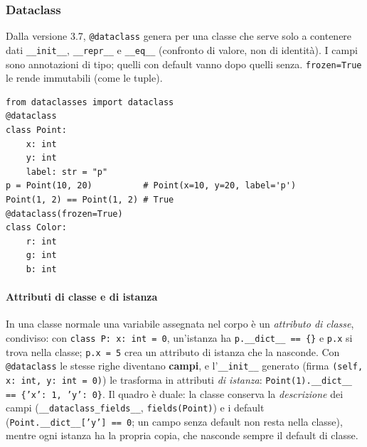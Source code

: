 \documentclass[a4paper,12pt]{article}
\begin{document}
\subsubsection{Dataclass}
Dalla versione 3.7, \texttt{@dataclass} genera per una classe che serve solo a contenere dati
\texttt{\_\_init\_\_}, \texttt{\_\_repr\_\_} e \texttt{\_\_eq\_\_} (confronto di valore, non di
identità). I campi sono annotazioni di tipo; quelli con default vanno dopo quelli senza.
\texttt{frozen=True} le rende immutabili (come le tuple).
\begin{verbatim}
from dataclasses import dataclass
@dataclass
class Point:
    x: int
    y: int
    label: str = "p"
p = Point(10, 20)          # Point(x=10, y=20, label='p')
Point(1, 2) == Point(1, 2) # True
@dataclass(frozen=True)
class Color:
    r: int
    g: int
    b: int
\end{verbatim}

\paragraph{Attributi di classe e di istanza} In una classe normale una variabile assegnata nel
corpo è un \emph{attributo di classe}, condiviso: con \texttt{class P: x: int = 0}, un'istanza
ha \texttt{p.\_\_dict\_\_ == \{\}} e \texttt{p.x} si trova nella classe; \texttt{p.x = 5} crea un
attributo di istanza che la nasconde. Con \texttt{@dataclass} le stesse righe diventano
\textbf{campi}, e l'\texttt{\_\_init\_\_} generato (firma \texttt{(self, x: int, y: int = 0)}) le
trasforma in attributi \emph{di istanza}: \texttt{Point(1).\_\_dict\_\_ == \{'x': 1, 'y': 0\}}.
Il quadro è duale: la classe conserva la \emph{descrizione} dei campi
(\texttt{\_\_dataclass\_fields\_\_}, \texttt{fields(Point)}) e i default
(\texttt{Point.\_\_dict\_\_['y'] == 0}; un campo senza default non resta nella classe), mentre ogni
istanza ha la propria copia, che nasconde sempre il default di classe.
\end{document}
